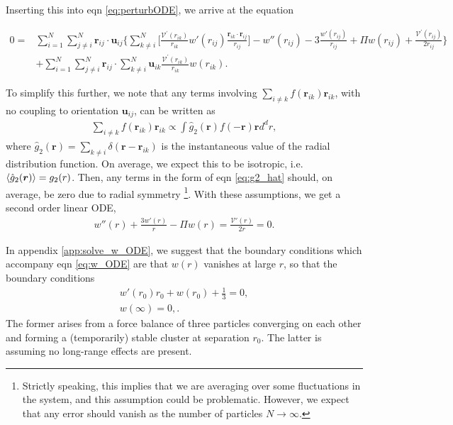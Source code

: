 \documentclass[twocolumn,amsmath,amssymb,aps]{revtex4-1}%
\begin{document}
Inserting this into eqn \ref{eq:perturbODE}, we arrive at the equation
\begin{widetext}
\begin{align}\label{eq:bigeq}
  0=&\sum_{i=1}^N\sum_{j\neq i}^N\bm{r}_{ij}\cdot\bm{u}_{ij}
  \bigg\{\sum_{k\neq i}^N\bigg[
    \frac{\mathcal{V}^{\prime}(r_{ik})}{r_{ik}}
    w'(r_{ij})\frac{\bm{r}_{ik}\cdot\bm{r}_{ij}}{r_{ij}}\bigg]
  -w''(r_{ij})-3\frac{w'(r_{ij})}{r_{ij}}
  +\Pi w(r_{ij})
  +\frac{\mathcal{V}^{\prime}(r_{ij})}{2r_{ij}}\bigg\}\nonumber\\
  &+\sum_{i=1}^N\sum_{j\neq i}^N\bm{r}_{ij}\cdot\sum_{k\neq i}^N
  \bm{u}_{ik}\frac{\mathcal{V}^{\prime}(r_{ik})}{r_{ik}}w(r_{ik}).
\end{align}
\end{widetext}

To simplify this further, we note that
any terms  involving $\sum_{i\neq k}f(\bm{r}_{ik})\bm{r}_{ik}$, with no
coupling to orientation $\bm{u}_{ij}$, can be written as
\begin{align}\label{eq:g2_hat}
  \sum_{i\neq k}f(\bm{r}_{ik})\bm{r}_{ik}
  \propto\int\hat{g}_2(\bm{r})f(-\bm{r})\bm{r}d^dr,
\end{align}
where $\hat{g}_2(\bm{r})=\sum_{k\neq i}\delta(\bm{r}-\bm{r}_{ik})$ is the
instantaneous value of the radial distribution function. On average, we
expect this to be isotropic, i.e. $\braket{\hat{g}_2(\bm{r})}=g_2(r)$.
Then, any terms in the form of eqn \ref{eq:g2_hat} should, on average, be
zero due to radial symmetry \footnote{Strictly speaking, this implies
  that we are averaging over some fluctuations in the system, and this
  assumption could be problematic. However, we expect that any error
  should vanish as the number of particles $N\to\infty$.}.
With these assumptions, we get a second order linear ODE,
\begin{align}\label{eq:w_ODE}
  w''(r)+\frac{3w'(r)}{r}-\Pi w(r)=\frac{\mathcal{V}'(r)}{2r}=0.
\end{align}

In appendix \ref{app:solve_w_ODE}, we suggest that the boundary conditions
which accompany eqn \ref{eq:w_ODE} are
that $w(r)$ vanishes at large $r$, so that the boundary conditions
\begin{subequations}
  \label{eqs:w_BCs}
  \begin{align}
    w'(r_0)r_0+w(r_0)+\frac{1}{3} = 0,\label{eq:w_BC_r0}\\
    w(\infty) = 0,\label{eq:w_BC_inf}.
  \end{align}
\end{subequations}
The former arises from a force balance of three
particles converging on each other and forming a (temporarily) stable
cluster at separation $r_0$. The latter is assuming no long-range effects
are present.
\end{document}
